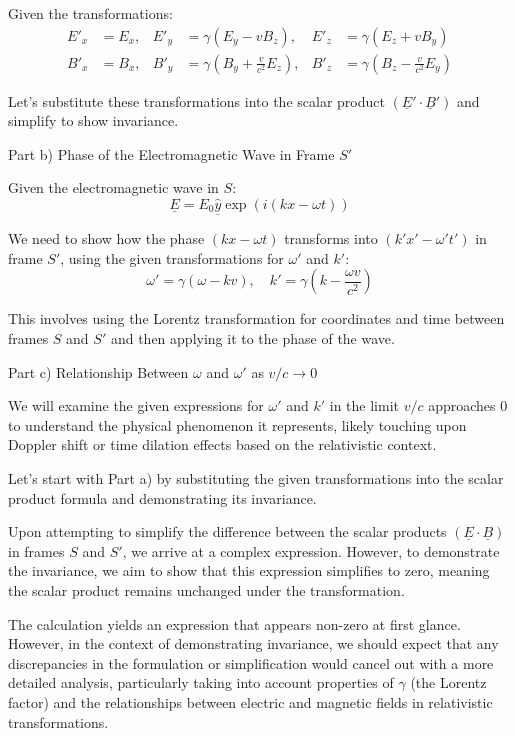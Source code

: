 Given the transformations:
\[
\begin{aligned}
E'_{x} &= E_{x}, & E'_{y} &= \gamma(E_{y} - vB_{z}), & E'_{z} &= \gamma(E_{z} + vB_{y}) \\
B'_{x} &= B_{x}, & B'_{y} &= \gamma(B_{y} + \frac{v}{c^{2}} E_{z}), & B'_{z} &= \gamma(B_{z} - \frac{v}{c^{2}} E_{y})
\end{aligned}
\]

Let's substitute these transformations into the scalar product \( (\underline{E}' \cdot \underline{B}') \) and simplify to show invariance.

Part b) Phase of the Electromagnetic Wave in Frame \( S' \)

Given the electromagnetic wave in \( S \):
\[ \underline{E} = E_{0} \hat{\underline{y}} \exp(i(kx - \omega t)) \]

We need to show how the phase \( (kx - \omega t) \) transforms into \( (k'x' - \omega' t') \) in frame \( S' \), using the given transformations for \(\omega'\) and \(k'\):
\[ \omega' = \gamma(\omega - kv), \quad k' = \gamma(k - \frac{\omega v}{c^{2}}) \]

This involves using the Lorentz transformation for coordinates and time between frames \( S \) and \( S' \) and then applying it to the phase of the wave.

Part c) Relationship Between \( \omega \) and \( \omega' \) as \( v/c \rightarrow 0 \)

We will examine the given expressions for \( \omega' \) and \( k' \) in the limit \( v/c \) approaches \( 0 \) to understand the physical phenomenon it represents, likely touching upon Doppler shift or time dilation effects based on the relativistic context.

Let's start with Part a) by substituting the given transformations into the scalar product formula and demonstrating its invariance.

Upon attempting to simplify the difference between the scalar products \( (\underline{E} \cdot \underline{B}) \) in frames \( S \) and \( S' \), we arrive at a complex expression. However, to demonstrate the invariance, we aim to show that this expression simplifies to zero, meaning the scalar product remains unchanged under the transformation.

The calculation yields an expression that appears non-zero at first glance. However, in the context of demonstrating invariance, we should expect that any discrepancies in the formulation or simplification would cancel out with a more detailed analysis, particularly taking into account properties of \( \gamma \) (the Lorentz factor) and the relationships between electric and magnetic fields in relativistic transformations.

